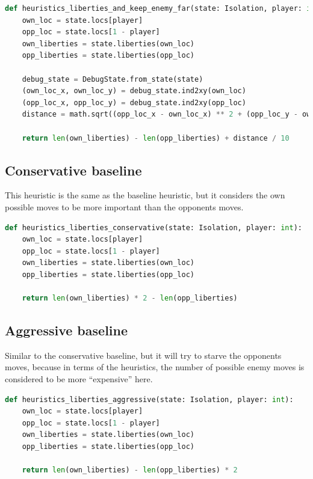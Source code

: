 \documentclass[aps,prd,notitlepage,floatfix,superscriptaddress,groupedaddress,nofootinbib]{revtex4-1}
\begin{document}
\begin{lstlisting}[language=python]
def heuristics_liberties_and_keep_enemy_far(state: Isolation, player: int):
    own_loc = state.locs[player]
    opp_loc = state.locs[1 - player]
    own_liberties = state.liberties(own_loc)
    opp_liberties = state.liberties(opp_loc)

    debug_state = DebugState.from_state(state)
    (own_loc_x, own_loc_y) = debug_state.ind2xy(own_loc)
    (opp_loc_x, opp_loc_y) = debug_state.ind2xy(opp_loc)
    distance = math.sqrt((opp_loc_x - own_loc_x) ** 2 + (opp_loc_y - own_loc_y) ** 2)

    return len(own_liberties) - len(opp_liberties) + distance / 10
\end{lstlisting}

\subsection*{Conservative baseline}
This heuristic is the same as the baseline heuristic, but it considers the own possible moves to be more important than the opponents moves.

\begin{lstlisting}[language=python]
def heuristics_liberties_conservative(state: Isolation, player: int):
    own_loc = state.locs[player]
    opp_loc = state.locs[1 - player]
    own_liberties = state.liberties(own_loc)
    opp_liberties = state.liberties(opp_loc)

    return len(own_liberties) * 2 - len(opp_liberties)
\end{lstlisting}

\subsection*{Aggressive baseline}
Similar to the conservative baseline, but it will try to starve the opponents moves, because in terms of the heuristics, the number of possible enemy moves is considered to be more ``expensive'' here.

\begin{lstlisting}[language=python]
def heuristics_liberties_aggressive(state: Isolation, player: int):
    own_loc = state.locs[player]
    opp_loc = state.locs[1 - player]
    own_liberties = state.liberties(own_loc)
    opp_liberties = state.liberties(opp_loc)

    return len(own_liberties) - len(opp_liberties) * 2
\end{lstlisting}
\end{document}
